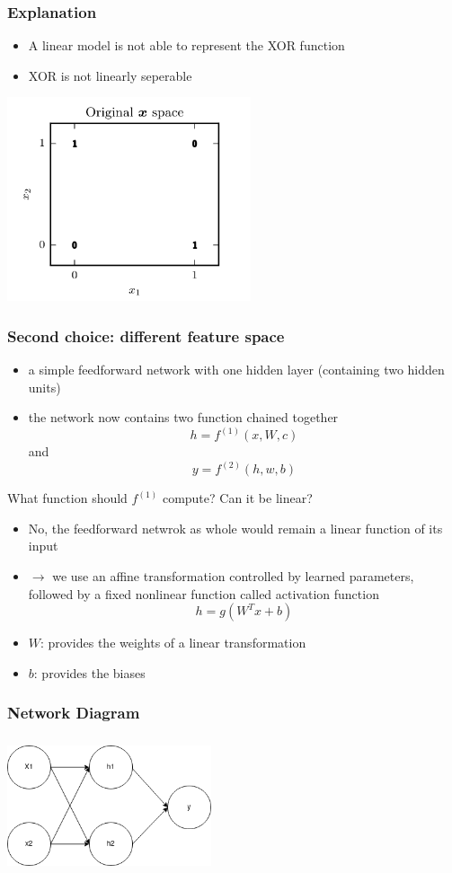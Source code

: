 \documentclass{beamer}
\begin{document}
\begin{frame}
	\frametitle{Explanation}
	\begin{itemize}
		\item A linear model is not able to represent the XOR function
		\item XOR is not linearly seperable
	\end{itemize}
	\center 
	\includegraphics[width = 80 mm, height = 60mm]{xor_graph1.png}
	
\end{frame}
\begin{frame}
	\frametitle{Second choice: different feature space}
	\begin{itemize}
		\item a simple feedforward network with one hidden layer (containing two hidden units)
		\item the network now contains two function chained together
			$$ h= f^{(1)}(x, W, c)$$ and $$ y = f^{(2)}(h, w, b)$$
	\end{itemize}
	\center 
	What function should $f^{(1)}$ compute? Can it be linear?
\end{frame}
\begin{frame}
\begin{itemize}
	\item No, the feedforward netwrok as whole would remain a linear function of its input
	\item $\rightarrow$ we use an affine transformation controlled by learned parameters, followed by a fixed nonlinear function called activation function $$h= g(W^Tx + b)$$
	\item $W$: provides the weights of a linear transformation
	\item $b$: provides the biases
\end{itemize}
\end{frame}
\begin{frame}
	\frametitle{Network Diagram}
	\center 
	\includegraphics[width= 60mm, height=40mm]{xor_nn.png}	
\end{frame}
\end{document}
